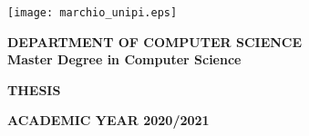 \begin{titlepage}
	\begin{center}
		\texttt{[image: marchio\_unipi.eps]}

		\vspace{1cm}
		\large
		\textbf{\MakeUppercase{Department of Computer Science}}\\
		\textbf{Master Degree in Computer Science}

		\vspace{3cm}
		\Large
		\textbf{\MakeUppercase{Thesis}}

		\vspace{0.5cm}
		\LARGE
		\textbf{\thesistitle}

		\vspace{3.5cm}
		\Large
		\peopleheader
		\textbf{\authornamefl} \hfill \textbf{\supervisors}        

		\vfill
		\large
		\textbf{\MakeUppercase{Academic year 2020/2021}}
    \end{center}
\end{titlepage}